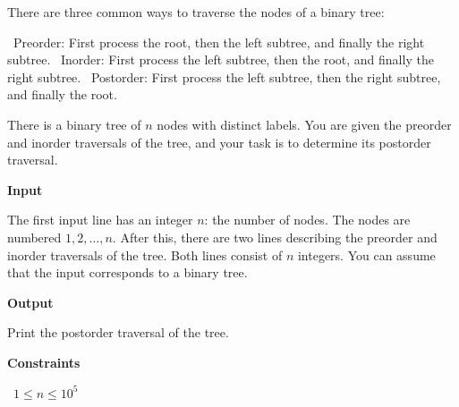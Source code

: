 There are three common ways to traverse the nodes of a binary tree:

\textbullet\ Preorder: First process the root, then the left subtree, and finally the right subtree.
\textbullet\ Inorder: First process the left subtree, then the root, and finally the right subtree.
\textbullet\ Postorder: First process the left subtree, then the right subtree, and finally the root.

There is a binary tree of $n$ nodes with distinct labels. You are given the preorder and inorder traversals of the tree, and your task is to determine its postorder traversal.

\vspace{0.3cm}\noindent\textbf{Input}

The first input line has an integer $n$: the number of nodes. The nodes are numbered $1,2,\dots,n$.
After this, there are two lines describing the preorder and inorder traversals of the tree. Both lines consist of $n$ integers.
You can assume that the input corresponds to a binary tree.

\vspace{0.3cm}\noindent\textbf{Output}

Print the postorder traversal of the tree.

\vspace{0.3cm}\noindent\textbf{Constraints}

\textbullet\ $1 \le n \le 10^5$
